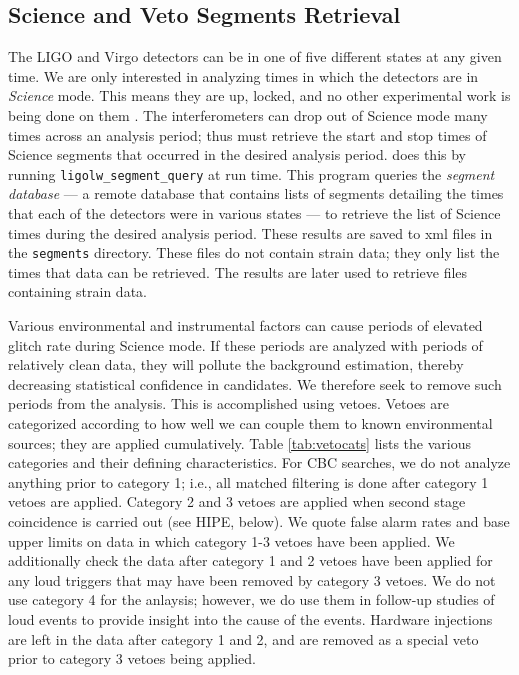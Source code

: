 \subsection{Science and Veto Segments Retrieval}

The \ac{LIGO} and Virgo detectors can be in one of five different states at any
given time. We are only interested in analyzing times in which the detectors
are in {\it Science} mode. This means they are up, locked, and no other
experimental work is being done on them \cite{?}. The interferometers
can drop out of Science mode many times across an analysis period; thus \ihope
must retrieve the start and stop times of Science segments that occurred in the
desired analysis period. \ihope does this by running
\texttt{ligolw\_segment\_query} at run time. This program queries the {\it
segment database} --- a remote database that contains lists of segments
detailing the times that each of the detectors were in various states --- to
retrieve the list of Science times during the desired analysis period. These
results are saved to xml files in the \texttt{segments} directory. These files
do not contain strain data; they only list the times that data can be
retrieved. The results are later used to retrieve files containing strain data.

Various environmental and instrumental factors can cause periods of elevated
glitch rate during Science mode. If these periods are analyzed with periods of
relatively clean data, they will pollute the background estimation, thereby
decreasing statistical confidence in candidates. We therefore seek to remove
such periods from the analysis. This is accomplished using vetoes. Vetoes are
categorized according to how well we can couple them to known environmental
sources; they are applied cumulatively. Table \ref{tab:vetocats} lists the
various categories and their defining characteristics. For \ac{CBC} searches,
we do not analyze anything prior to category 1; i.e., all matched filtering is
done after category 1 vetoes are applied. Category 2 and 3 vetoes are applied
when second stage coincidence is carried out (see HIPE, below). We quote false
alarm rates and base upper limits on data in which category 1-3 vetoes have
been applied. We additionally check the data after category 1 and 2 vetoes have
been applied for any loud triggers that may have been removed by category 3
vetoes. We do not use category 4 for the anlaysis; however, we do use them in
follow-up studies of loud events to provide insight into the cause of the
events. Hardware injections are left in the data after category 1 and 2, and
are removed as a special veto prior to category 3 vetoes being applied.

